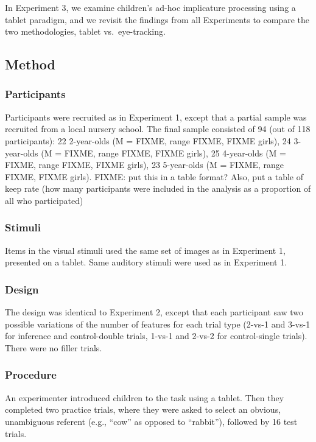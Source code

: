 \documentclass[a4paper,man,apacite,floatsintext]{apa6}
\begin{document}
In Experiment 3, we examine children's ad-hoc implicature processing
using a tablet paradigm, and we revisit the findings from all
Experiments to compare the two methodologies, tablet vs.~eye-tracking.

\subsection{Method}\label{method-2}

\subsubsection{Participants}\label{participants-2}

Participants were recruited as in Experiment 1, except that a partial
sample was recruited from a local nursery school. The final sample
consisted of 94 (out of 118 participants): 22 2-year-olds (M = FIXME,
range FIXME, FIXME girls), 24 3-year-olds (M = FIXME, range FIXME, FIXME
girls), 25 4-year-olds (M = FIXME, range FIXME, FIXME girls), 23
5-year-olds (M = FIXME, range FIXME, FIXME girls). FIXME: put this in a
table format? Also, put a table of keep rate (how many participants were
included in the analysis as a proportion of all who participated)

\subsubsection{Stimuli}\label{stimuli-1}

Items in the visual stimuli used the same set of images as in Experiment
1, presented on a tablet. Same auditory stimuli were used as in
Experiment 1.

\subsubsection{Design}\label{design}

The design was identical to Experiment 2, except that each participant
saw two possible variations of the number of features for each trial
type (2-vs-1 and 3-vs-1 for inference and control-double trials, 1-vs-1
and 2-vs-2 for control-single trials). There were no filler trials.

\subsubsection{Procedure}\label{procedure-1}

An experimenter introduced children to the task using a tablet. Then
they completed two practice trials, where they were asked to select an
obvious, unambiguous referent (e.g., ``cow'' as opposed to ``rabbit''),
followed by 16 test trials.
\end{document}
